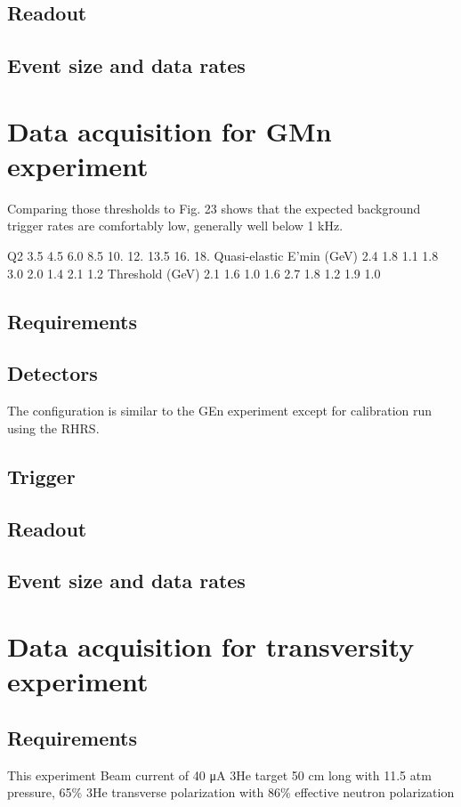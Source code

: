 \documentclass{article}
\begin{document}
\subsection{Readout}

\subsection{Event size and data rates}
\section{Data acquisition for GMn experiment}
Comparing those thresholds
to Fig. 23 shows that the expected background trigger rates are comfortably low, generally well
below 1 kHz.

Q2 3.5 4.5 6.0 8.5 10. 12. 13.5 16. 18.
Quasi-elastic E’min (GeV) 2.4 1.8 1.1 1.8 3.0 2.0 1.4 2.1 1.2
Threshold (GeV) 2.1 1.6 1.0 1.6 2.7 1.8 1.2 1.9 1.0



\subsection{Requirements}
\subsection{Detectors}
The configuration is similar to the GEn experiment except for calibration run using the RHRS.

\subsection{Trigger}

\subsection{Readout}

\subsection{Event size and data rates}

\section{Data acquisition for transversity experiment}
\subsection{Requirements}
This experiment
Beam current of 40 μA
3He target 50 cm long with 11.5 atm pressure, 65\% 3He transverse polarization with
86\% effective neutron polarization
\end{document}
